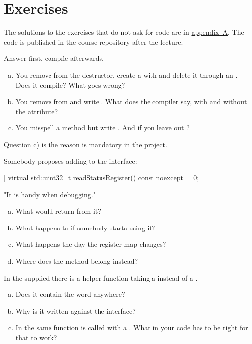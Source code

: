 \section*{Exercises}

The solutions to the exercises that do not ask for code are in
\hyperref[ch:losningar]{appendix~A}. The code is published in the course repository after the
lecture.

\label{ex:6:1}
Answer first, compile afterwards.
\begin{enumerate}[a)]
  \item You remove  from the destructor, create a  with  and
    delete it through an . Does it compile? What goes wrong?
  \item You remove \code{[[nodiscard]]} from  and write
    . What does the compiler say, with and without the attribute?
  \item You misspell a method but write . And if you leave out ?
\end{enumerate}
Question c) is the reason  is mandatory in the project.

\label{ex:6:2}
Somebody proposes adding to the interface:
\begin{cppcode}
[[nodiscard]] virtual std::uint32_t readStatusRegister() const noexcept = 0;
\end{cppcode}
"It is handy when debugging."
\begin{enumerate}[a)]
  \item What would  return from it?
  \item What happens to  if somebody starts using it?
  \item What happens the day the register map changes?
  \item Where does the method belong instead?
\end{enumerate}

\label{ex:6:3}
In the supplied  there is a helper function taking a
 instead of a .
\begin{enumerate}[a)]
  \item Does it contain the word  anywhere?
  \item Why is it written against the interface?
  \item In  the same function is called with a . What in your code
    has to be right for that to work?
\end{enumerate}


